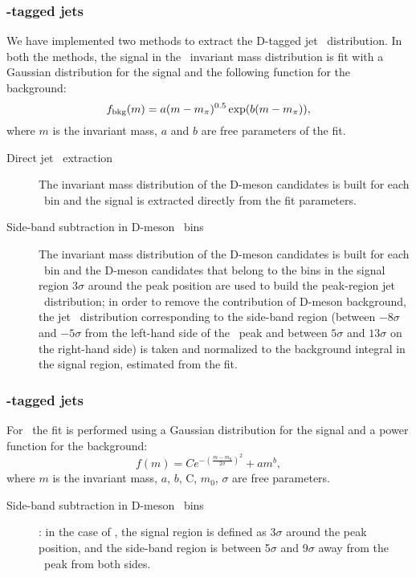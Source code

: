 \subsubsection{\Dstar-tagged jets}
We have implemented two methods to extract the D-tagged jet \pt\ distribution. 
In both the methods, the signal in the \Dstar\ invariant mass distribution is fit with a Gaussian distribution for the 
signal and the following function for the background:
\begin{equation}
\label{e_bkgDStar}
f_{\rm bkg} (m) = a (m-m_{\pi})^{0.5}\exp(b (m-m_{\pi})),
\end{equation}
where $m$ is the invariant mass, $a$ and $b$ are free parameters of the fit.
\begin{description}
\item[Direct jet \pt\ extraction] The invariant mass distribution of the D-meson candidates is built for each \ptchjet\ bin and the signal is extracted directly from the fit parameters.
\item[Side-band subtraction in D-meson \pt\ bins] The invariant mass distribution of the D-meson candidates is built for each \ptd\ bin and 
the D-meson candidates that belong to the bins in the signal region $3\sigma$ around the peak position are used to build the peak-region jet \pt\ distribution;
in order to remove the contribution of D-meson background, the jet \pt\ distribution corresponding 
to the side-band region (between $-8\sigma$ and $-5\sigma$ from the left-hand side of the \Dstar\ peak and between $5\sigma$ and $13\sigma$ on the right-hand side) is taken and normalized to the background integral in the signal region, estimated from the fit.
\end{description}

\subsubsection{\Dzero-tagged jets}
For \Dzero\ the fit is performed using a Gaussian distribution for the signal and a power function for the background:
\begin{equation}
\label{e_sigbkgDZero}
f (m) = Ce^{-(\frac{m-m_0}{2\sigma})^2} + am^b,
\end{equation}
where $m$ is the invariant mass, $a$, $b$, C, $m_0$, $\sigma$ are free parameters.

\begin{description}
\item[Side-band subtraction in D-meson \pt\ bins]: in the case of \Dzero, the signal region is defined as $3\sigma$ around the peak position, and the side-band region is between 5$\sigma$ and 9$\sigma$ away from the \Dzero\ peak from both sides.
\end{description}

